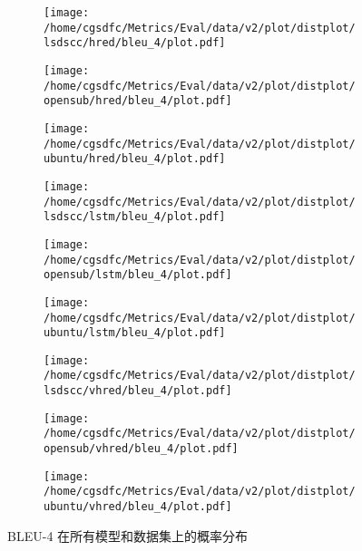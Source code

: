 \begin{figure}[H]%
\centering%
\begin{subfigure}{0.3333333333333333\linewidth}%
\centering%
\texttt{[image: /home/cgsdfc/Metrics/Eval/data/v2/plot/distplot/lsdscc/hred/bleu\_4/plot.pdf]}%
\end{subfigure}%
\begin{subfigure}{0.3333333333333333\linewidth}%
\centering%
\texttt{[image: /home/cgsdfc/Metrics/Eval/data/v2/plot/distplot/opensub/hred/bleu\_4/plot.pdf]}%
\end{subfigure}%
\begin{subfigure}{0.3333333333333333\linewidth}%
\centering%
\texttt{[image: /home/cgsdfc/Metrics/Eval/data/v2/plot/distplot/ubuntu/hred/bleu\_4/plot.pdf]}%
\end{subfigure}%
\newline%
\begin{subfigure}{0.3333333333333333\linewidth}%
\centering%
\texttt{[image: /home/cgsdfc/Metrics/Eval/data/v2/plot/distplot/lsdscc/lstm/bleu\_4/plot.pdf]}%
\end{subfigure}%
\begin{subfigure}{0.3333333333333333\linewidth}%
\centering%
\texttt{[image: /home/cgsdfc/Metrics/Eval/data/v2/plot/distplot/opensub/lstm/bleu\_4/plot.pdf]}%
\end{subfigure}%
\begin{subfigure}{0.3333333333333333\linewidth}%
\centering%
\texttt{[image: /home/cgsdfc/Metrics/Eval/data/v2/plot/distplot/ubuntu/lstm/bleu\_4/plot.pdf]}%
\end{subfigure}%
\newline%
\begin{subfigure}{0.3333333333333333\linewidth}%
\centering%
\texttt{[image: /home/cgsdfc/Metrics/Eval/data/v2/plot/distplot/lsdscc/vhred/bleu\_4/plot.pdf]}%
\end{subfigure}%
\begin{subfigure}{0.3333333333333333\linewidth}%
\centering%
\texttt{[image: /home/cgsdfc/Metrics/Eval/data/v2/plot/distplot/opensub/vhred/bleu\_4/plot.pdf]}%
\end{subfigure}%
\begin{subfigure}{0.3333333333333333\linewidth}%
\centering%
\texttt{[image: /home/cgsdfc/Metrics/Eval/data/v2/plot/distplot/ubuntu/vhred/bleu\_4/plot.pdf]}%
\end{subfigure}%
\caption{BLEU{-}4 在所有模型和数据集上的概率分布}%
\label{fig:BLEU{-}4{-}dist{-}all}%
\end{figure}